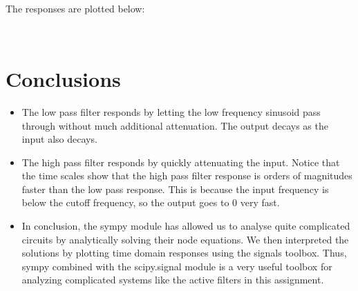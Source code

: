 \documentclass[11pt]{article}
\providecommand{\tightlist}{%
      \setlength{\itemsep}{0pt}\setlength{\parskip}{0pt}}
\begin{document}
	

    \begin{center}
    \end{center}
    { \hspace*{\fill} \\}
    
	
		
    The responses are plotted below:

	

	

    \begin{center}
    \end{center}
    { \hspace*{\fill} \\}
    
	
		
    \section{Conclusions}\label{conclusions}

\begin{itemize}
\tightlist
\item
  The low pass filter responds by letting the low frequency sinusoid
  pass through without much additional attenuation. The output decays as
  the input also decays.
\item
  The high pass filter responds by quickly attenuating the input. Notice
  that the time scales show that the high pass filter response is orders
  of magnitudes faster than the low pass response. This is because the
  input frequency is below the cutoff frequency, so the output goes to
  \(0\) very fast.
\item
  In conclusion, the sympy module has allowed us to analyse quite
  complicated circuits by analytically solving their node equations. We
  then interpreted the solutions by plotting time domain responses using
  the signals toolbox. Thus, sympy combined with the scipy.signal module
  is a very useful toolbox for analyzing complicated systems like the
  active filters in this assignment.
\end{itemize}

	


    
    
    
    
\end{document}

